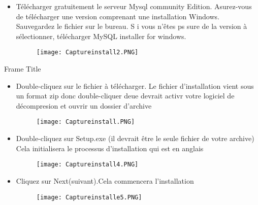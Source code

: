 \documentclass{beamer}
\begin{document}
     \begin{frame}
         
     \begin{itemize}
     \item T\'el\'echarger gratuitement le serveur Mysql community Edition. Asurez-vous de télécharger une version comprenant une installation Windows. Sauvegardez le fichier sur le bureau. S i vous n'\^etes ps sure de la version à sélectionner, télécharger MySQL installer for windows.
      \begin{figure}[h]
\centering	
 \texttt{[image: Captureinstall2.PNG]}
\end{figure}
\end{itemize}
\end{frame}
\begin{frame}{Frame Title}
    
\begin{itemize}

     \item Double-cliquez sur le fichier à télécharger. Le fichier d'installation vient sous un format zip donc double-cliquer deue devrait activr votre logiciel de décompresion et ouvrir un dossier d'archive
      \begin{figure}[h]
\centering	
 \texttt{[image: Captureinstall.PNG]}
\end{figure}
\end{itemize}
\end{frame}
\begin{frame}
\begin{itemize}
    
     \item Double-cliquez sur Setup.exe (il devrait être le seule fichier de votre archive) Cela initialisera le processus d'installation qui est en anglais
           \begin{figure}[h]
\centering	
 \texttt{[image: Captureinstall4.PNG]}
\end{figure}
\end{itemize}
\end{frame}
\begin{frame}
\begin{itemize}
    
     \item Cliquez sur Next(suivant).Cela commencera l'installation
           \begin{figure}[h]
\centering	
 \texttt{[image: Captureinstalle5.PNG]}
\end{figure}
     \end{itemize}
     
 \end{frame}
\end{document}
